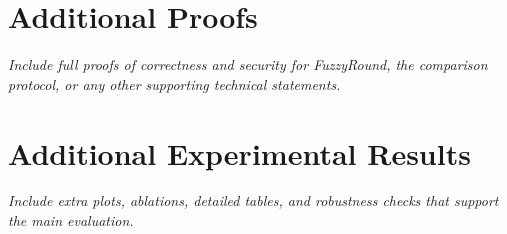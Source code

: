 \section{Additional Proofs}
\textit{Include full proofs of correctness and security for FuzzyRound, the comparison protocol, or any other supporting technical statements.}

\section{Additional Experimental Results}
\textit{Include extra plots, ablations, detailed tables, and robustness checks that support the main evaluation.}




